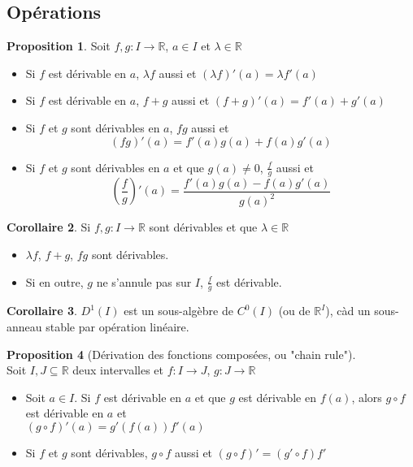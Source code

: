 \documentclass[10pt,a4paper]{article}
\theoremstyle{definition}
\newtheorem{proposition}{Proposition}[section]
\newtheorem{corollaire}[proposition]{Corollaire}
\begin{document}
\subsection{Opérations}
\begin{proposition}
Soit $f,g: I \to \mathbb{R}$, $a \in I$ et $\lambda \in \mathbb{R}$
\begin{itemize}
\item Si $f$ est dérivable en $a$, $\lambda f$ aussi et $(\lambda f)' (a) = \lambda f'(a)$
\item Si $f$ est dérivable en $a$, $f + g$ aussi et $(f + g)'(a) = f'(a) + g'(a)$
\item Si $f$ et $g$ sont dérivables en $a$, $fg$ aussi et
\[(fg)'(a) = f'(a)g(a) + f(a)g'(a)\]
\item Si $f$ et $g$ sont dérivables en $a$ et que $g(a) \neq 0$, $\frac{f}{g}$ aussi et
\[\left(\frac{f}{g}\right)'(a) = \frac{f'(a)g(a) - f(a)g'(a)}{g(a)^2}\]
\end{itemize}
\end{proposition}
\begin{corollaire}
Si $f,g : I \to \mathbb{R}$ sont dérivables et que $\lambda \in \mathbb{R}$
\begin{itemize}
\item $\lambda f$, $f + g$, $fg$ sont dérivables.
\item Si en outre, $g$ ne s'annule pas sur $I$, $\frac{f}{g}$ est dérivable.
\end{itemize}
\end{corollaire}
\begin{corollaire}
$D^1(I)$ est un sous-algèbre de $C^0(I)$ (ou de $\mathbb{R}^I$), càd un sous-anneau stable par opération linéaire.
\end{corollaire}
\begin{proposition}[Dérivation des fonctions composées, ou "chain rule"]
\hfill \\
Soit $I, J \subseteq \mathbb{R}$ deux intervalles et $f: I \to J$, $g: J \to \mathbb{R}$
\begin{itemize}
\item Soit $a \in I$. Si $f$ est dérivable en $a$ et que $g$ est dérivable en $f(a)$, alors $g \circ f$ est dérivable en $a$ et \\
$(g \circ f)'(a) = g'(f(a)) f'(a)$
\item Si $f$ et $g$ sont dérivables, $g \circ f$ aussi et $(g \circ f)' = (g' \circ f)f'$
\end{itemize}
\end{proposition}
\end{document}
